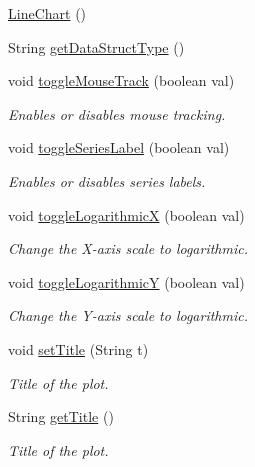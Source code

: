 \begin{DoxyCompactItemize}
\item 
\mbox{\hyperlink{classbridges_1_1base_1_1_line_chart_ae864fe5ae85e80ae2f035471fb216e68}{Line\+Chart}} ()
\item 
String \mbox{\hyperlink{classbridges_1_1base_1_1_line_chart_ae5d7ebffc6f29256f6fff368ef9a6c84}{get\+Data\+Struct\+Type}} ()
\item 
void \mbox{\hyperlink{classbridges_1_1base_1_1_line_chart_a095d16c1544cf373b8d2bf68ca864bd9}{toggle\+Mouse\+Track}} (boolean val)
\begin{DoxyCompactList}\small\item\em Enables or disables mouse tracking. \end{DoxyCompactList}\item 
void \mbox{\hyperlink{classbridges_1_1base_1_1_line_chart_adae74cfb09585727a96cf74ddf74d098}{toggle\+Series\+Label}} (boolean val)
\begin{DoxyCompactList}\small\item\em Enables or disables series labels. \end{DoxyCompactList}\item 
void \mbox{\hyperlink{classbridges_1_1base_1_1_line_chart_ad3e5e54c382ac605a81b6b61c250ad16}{toggle\+LogarithmicX}} (boolean val)
\begin{DoxyCompactList}\small\item\em Change the X-\/axis scale to logarithmic. \end{DoxyCompactList}\item 
void \mbox{\hyperlink{classbridges_1_1base_1_1_line_chart_a7946f217a7b3567ee1a1bd8266ed43ca}{toggle\+LogarithmicY}} (boolean val)
\begin{DoxyCompactList}\small\item\em Change the Y-\/axis scale to logarithmic. \end{DoxyCompactList}\item 
void \mbox{\hyperlink{classbridges_1_1base_1_1_line_chart_a893519da804666988c49b918c87da2a2}{set\+Title}} (String t)
\begin{DoxyCompactList}\small\item\em Title of the plot. \end{DoxyCompactList}\item 
String \mbox{\hyperlink{classbridges_1_1base_1_1_line_chart_aedc5f75b158298b755ba0c31bcf84138}{get\+Title}} ()
\begin{DoxyCompactList}\small\item\em Title of the plot. \end{DoxyCompactList}\item 

\end{DoxyCompactItemize}
